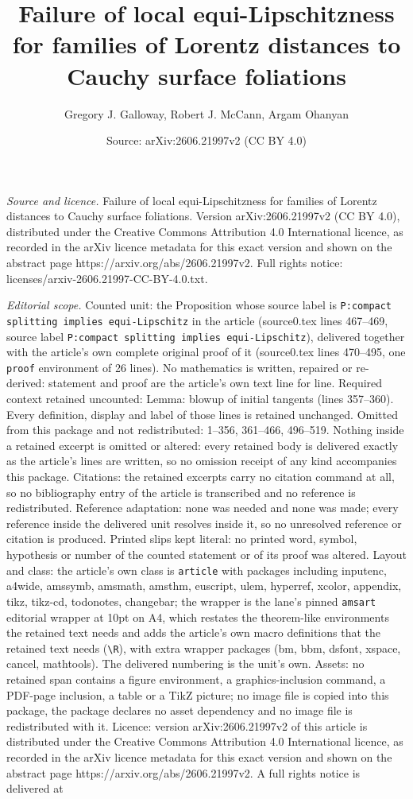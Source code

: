 \documentclass[10pt,a4paper]{amsart}
\title[Failure of local equi-Lipschitzness for families of Lorentz ]{Failure of local equi-Lipschitzness for families of Lorentz distances to Cauchy surface foliations}
\author{Gregory J. Galloway, Robert J. McCann, Argam Ohanyan}
\date{Source: arXiv:2606.21997v2 (CC BY 4.0)}
\begin{document}
\maketitle

\noindent\emph{Source and licence.} Failure of local equi-Lipschitzness for families of Lorentz distances to Cauchy surface foliations. Version arXiv:2606.21997v2 (CC BY 4.0), distributed under the Creative Commons Attribution 4.0 International licence, as recorded in the arXiv licence metadata for this exact version and shown on the abstract page https://arxiv.org/abs/2606.21997v2. Full rights notice: licenses/arxiv-2606.21997-CC-BY-4.0.txt.\par\smallskip

\noindent\textit{Editorial scope.} Counted unit: the Proposition whose source label is \texttt{P:compact splitting implies equi-Lipschitz} in the article (source0.tex lines 467--469, source label \texttt{P:compact splitting implies equi-Lipschitz}), delivered together with the article's own complete original proof of it (source0.tex lines 470--495, one \texttt{proof} environment of 26 lines). No mathematics is written, repaired or re-derived: statement and proof are the article's own text line for line. Required context retained uncounted: Lemma: blowup of initial tangents (lines 357--360). Every definition, display and label of those lines is retained unchanged. Omitted from this package and not redistributed: 1--356, 361--466, 496--519. Nothing inside a retained excerpt is omitted or altered: every retained body is delivered exactly as the article's lines are written, so no omission receipt of any kind accompanies this package. Citations: the retained excerpts carry no citation command at all, so no bibliography entry of the article is transcribed and no reference is redistributed. Reference adaptation: none was needed and none was made; every reference inside the delivered unit resolves inside it, so no unresolved reference or citation is produced. Printed slips kept literal: no printed word, symbol, hypothesis or number of the counted statement or of its proof was altered. Layout and class: the article's own class is \texttt{article} with packages including inputenc, a4wide, amssymb, amsmath, amsthm, euscript, ulem, hyperref, xcolor, appendix, tikz, tikz-cd, todonotes, changebar; the wrapper is the lane's pinned \texttt{amsart} editorial wrapper at 10pt on A4, which restates the theorem-like environments the retained text needs and adds the article's own macro definitions that the retained text needs (\texttt{\textbackslash R}), with extra wrapper packages (bm, bbm, dsfont, xspace, cancel, mathtools). The delivered numbering is the unit's own. Assets: no retained span contains a figure environment, a graphics-inclusion command, a PDF-page inclusion, a table or a TikZ picture; no image file is copied into this package, the package declares no asset dependency and no image file is redistributed with it. Licence: version arXiv:2606.21997v2 of this article is distributed under the Creative Commons Attribution 4.0 International licence, as recorded in the arXiv licence metadata for this exact version and shown on the abstract page https://arxiv.org/abs/2606.21997v2. A full rights notice is delivered at 
\end{document}
